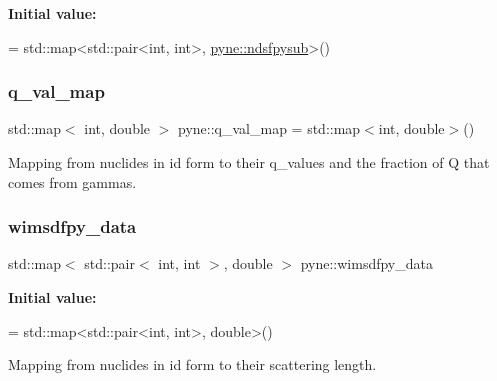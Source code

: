 {\bfseries Initial value\+:}
\begin{DoxyCode}
= 
  std::map<std::pair<int, int>, \hyperlink{structpyne_1_1ndsfpysub}{pyne::ndsfpysub}>()
\end{DoxyCode}
\mbox{\label{namespacepyne_af7b850fa105454bc35f4167d41071239}} 
\subsubsection{\texorpdfstring{q\+\_\+val\+\_\+map}{q\_val\_map}}
{\footnotesize\ttfamily std\+::map$<$ int, double $>$ pyne\+::q\+\_\+val\+\_\+map = std\+::map$<$int, double$>$()}

Mapping from nuclides in id form to their q\+\_\+values and the fraction of Q that comes from gammas. \mbox{\label{namespacepyne_a2512ebcde5e39e49cd6ed25bb09ff374}} 
\subsubsection{\texorpdfstring{wimsdfpy\+\_\+data}{wimsdfpy\_data}}
{\footnotesize\ttfamily std\+::map$<$ std\+::pair$<$ int, int $>$, double $>$ pyne\+::wimsdfpy\+\_\+data}

{\bfseries Initial value\+:}
\begin{DoxyCode}
= 
  std::map<std::pair<int, int>, \textcolor{keywordtype}{double}>()
\end{DoxyCode}


Mapping from nuclides in id form to their scattering length. 

